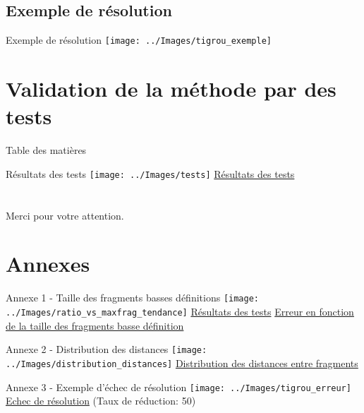 \documentclass[10pt, aspectratio=43]{beamer}
\begin{document}
	\subsection[Exemple]{Exemple de résolution}
	\begin{frame}{Exemple de résolution}
		\centering
		\texttt{[image: ../Images/tigrou\_exemple]}
	\end{frame}

	\section[Tests]{Validation de la méthode par des tests}
	\begin{frame}{Table des matières}
		
		\tableofcontents[currentsection]
		
	\end{frame}
	\begin{frame}{Résultats des tests}
		\centering
		\texttt{[image: ../Images/tests]}
		\underline{Résultats des tests}
	\end{frame}

	\section{}

	\begin{frame}
		\centering
		\Large Merci pour votre attention.
	\end{frame}

	\section{Annexes}


	\begin{frame}{Annexe 1 - Taille des fragments basses définitions}
		\centering
		\texttt{[image: ../Images/ratio\_vs\_maxfrag\_tendance]}
		\underline{Résultats des tests}
		\underline{Erreur en fonction de la taille des fragments basse définition}
	\end{frame}

	\begin{frame}{Annexe 2 - Distribution des distances}
		\centering
		\texttt{[image: ../Images/distribution\_distances]}
		\underline{Distribution des distances entre fragments}
	\end{frame}

	\begin{frame}{Annexe 3 - Exemple d'échec de résolution}
		\centering
		\texttt{[image: ../Images/tigrou\_erreur]}
		\underline{Echec de résolution} (Taux de réduction: 50)
	\end{frame}
\end{document}
